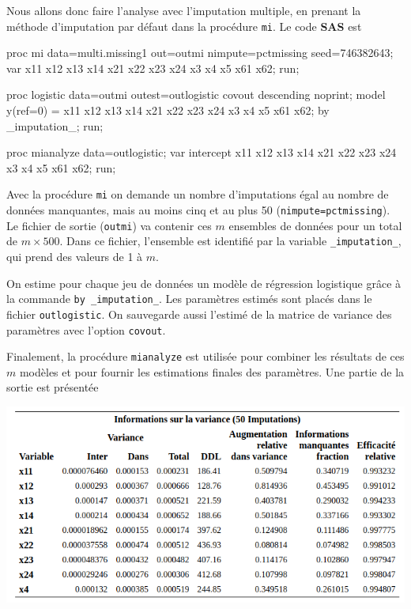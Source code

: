 \documentclass[
  11pt,
  letterpaper,
]{book}
\newenvironment{Shaded}{\begin{snugshade}}{\end{snugshade}}
\newcommand{\NormalTok}[1]{#1}
\theoremstyle{definition}
\theoremstyle{definition}
\theoremstyle{definition}
\theoremstyle{definition}
\theoremstyle{remark}
\begin{document}
Nous allons donc faire l'analyse avec l'imputation multiple, en prenant la méthode d'imputation par défaut dans la procédure \texttt{mi}. Le code \textbf{SAS} est

\begin{Shaded}
\begin{Highlighting}[]
\NormalTok{proc mi data=multi.missing1 out=outmi }
\NormalTok{    nimpute=pctmissing seed=746382643;}
\NormalTok{var x11 x12 x13 x14 x21 x22 x23 x24 x3 x4 x5 x61 x62;}
\NormalTok{run;}

\NormalTok{proc logistic data=outmi outest=outlogistic }
\NormalTok{    covout descending noprint;}
\NormalTok{model y(ref=\textquotesingle{}0\textquotesingle{}) = x11 x12 x13 x14 x21 x22 x23 x24 x3 x4 x5 x61 x62;}
\NormalTok{by \_imputation\_;}
\NormalTok{run;}

\NormalTok{proc mianalyze data=outlogistic;}
\NormalTok{var intercept x11 x12 x13 x14 x21 x22 x23 x24 x3 x4 x5 x61 x62;}
\NormalTok{run;}
\end{Highlighting}
\end{Shaded}

Avec la procédure \texttt{mi} on demande un nombre d'imputations égal au nombre de données manquantes, mais au moins cinq et au plus 50 (\texttt{nimpute=pctmissing}). Le fichier de sortie (\texttt{outmi}) va contenir ces \(m\) ensembles de données pour un total de \(m \times 500\). Dans ce fichier, l'ensemble est identifié par la variable \texttt{\_imputation\_}, qui prend des valeurs de 1 à \(m\).

On estime pour chaque jeu de données un modèle de régression logistique grâce à la commande \texttt{by\ \_imputation\_}. Les paramètres estimés sont placés dans le fichier \texttt{outlogistic}. On sauvegarde aussi l'estimé de la matrice de variance des paramètres avec l'option \texttt{covout}.

Finalement, la procédure \texttt{mianalyze} est utilisée pour combiner les résultats de ces \(m\) modèles et pour fournir les estimations finales des paramètres. Une partie de la sortie est présentée

\begin{center}\includegraphics[width=0.8\linewidth]{figures/06-manquantes-e4} \end{center}
\end{document}

